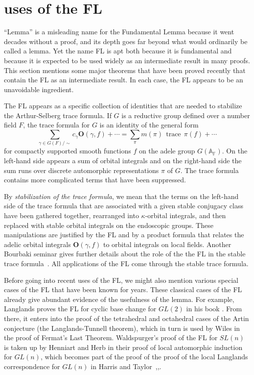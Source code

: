 \documentclass[brochure,english,12pt]{bourbaki}
\theoremstyle{plain}
\def\op#1{{\operatorname{#1}}}
\newcommand{\ring}[1]{\mathbb{#1}}
\def\OO{{\mathbf O}}
\begin{document}
\section{uses of the FL}  \label{sec:uses}

``Lemma'' is a misleading name for the Fundamental Lemma because it
went decades without a proof, and its depth goes far beyond what would
ordinarily be called a lemma.  Yet the name FL is apt both because it
is fundamental and because it is expected to be used widely as an
intermediate result in many proofs.  This section mentions some major
theorems that have been proved recently that contain the FL as an
intermediate result.  In each case, the FL appears to be an
unavoidable ingredient.

The FL appears as a specific collection of identities
that are needed to stabilize the Arthur-Selberg trace formula.  
If $G$ is a reductive group defined over a number field $F$, 
the trace formula for $G$ is an identity of the general form
\[
\sum_{\gamma\in G(F)/\sim} c_\gamma \OO(\gamma,f) +\cdots = 
\sum_\pi m(\pi) \,\op{trace}\, \pi(f) + \cdots
\]
for compactly supported smooth functions $f$ on the adele group
$G(\ring{A_F})$.  On the left-hand side appears a sum of orbital integrals
and on the right-hand side the sum runs over discrete automorphic
representations $\pi$ of $G$.    The trace formula contains more complicated terms that have
been suppressed.

By {\it stabilization of the trace formula}, we mean that the terms on
the left-hand side of the trace formula that are associated with a
given stable conjugacy class have been gathered together, rearranged
into $\kappa$-orbital integrals, and then replaced with stable orbital
integrals on the endoscopic groups.  These manipulations are justified
by the FL and by a product formula that relates the adelic orbital
integrals $\OO(\gamma,f)$ to orbital integrals on local fields.
Another Bourbaki seminar gives further details about the role of the
the FL in the stable trace formula~\cite{Dat:2004}.  All applications
of the FL come through the stable trace formula.

Before going into recent uses of the FL, we might also mention various
special cases of the FL that have been known for years.  These classical
cases of the FL already give abundant evidence of the usefulness of
the lemma.  For example, Langlands proves the FL for
cyclic base change for $GL(2)$ in his book \cite[Lemma~5.10]{LBC:1980}.
From there, it enters into the proof of the tetrahedral and
octahedral cases of the Artin conjecture (the Langlands-Tunnell theorem),
which in turn is used by Wiles in the proof of Fermat's Last Theorem.
Waldspurger's proof of the FL for $SL(n)$ is taken up by Henniart and Herb in their
proof of local automorphic induction for $GL(n)$, which becomes part of the
proof of the proof of the local Langlands correspondence for $GL(n)$
in Harris and Taylor~\cite{Wald:1991},\cite{Herb:Autoinduct},\cite{Harris:Taylor:local}.  
\end{document}
